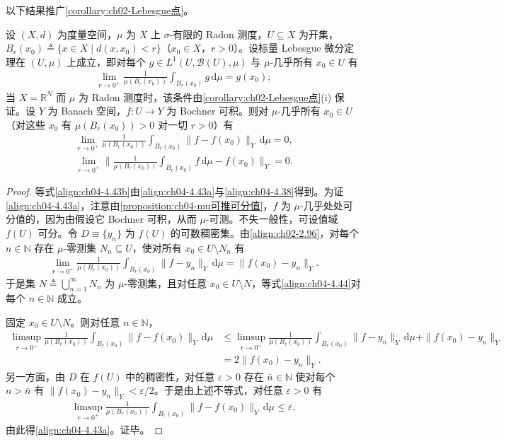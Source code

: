 \documentclass[../../main.tex]{subfiles}%
\begin{document}
以下结果推广\cref{corollary:ch02-Lebesgue点}。

\begin{proposition}\label{proposition:ch04-Lebesgue点}
设 $(X,d)$ 为度量空间，$\mu$ 为 $X$ 上 $\sigma$-有限的 Radon 测度，$U\subseteq X$ 为开集，$B_r(x_0)\triangleq\{x\in X\mid d(x,x_0)<r\}$（$x_0\in X$，$r>0$）。设标量 Lebesgue 微分定理在 $(U,\mu)$ 上成立，即对每个 $g\in L^1(U,\mathcal{B}(U),\mu)$ 与 $\mu$-几乎所有 $x_0\in U$ 有
\begin{align*}
\lim_{r\to0^+}\frac{1}{\mu(B_r(x_0))}\int_{B_r(x_0)}g\,\mathrm{d}\mu=g(x_0);
\end{align*}
当 $X=\mathbb{R}^N$ 而 $\mu$ 为 Radon 测度时，该条件由\cref{corollary:ch02-Lebesgue点}(i) 保证。设 $Y$ 为 Banach 空间，$f:U\to Y$ 为 Bochner 可积。则对 $\mu$-几乎所有 $x_0\in U$（对这些 $x_0$ 有 $\mu(B_r(x_0))>0$ 对一切 $r>0$）有
\begin{align}
\lim_{r\to0^+}\frac1{\mu(B_r(x_0))}\int_{B_r(x_0)}\|f-f(x_0)\|_Y\,\mathrm{d}\mu=0, \label{align:ch04-4.43a}
\end{align}
\begin{align}
\lim_{r\to0^+}\Big\|\frac1{\mu(B_r(x_0))}\int_{B_r(x_0)}f\,\mathrm{d}\mu-f(x_0)\Big\|_Y=0. \label{align:ch04-4.43b}
\end{align}
\end{proposition}

\begin{proof}
等式\eqref{align:ch04-4.43b}由\eqref{align:ch04-4.43a}与\eqref{align:ch04-4.38}得到。为证\eqref{align:ch04-4.43a}，注意由\cref{proposition:ch04-mu可推可分值}，$f$ 为 $\mu$-几乎处处可分值的，因为由假设它 Bochner 可积，从而 $\mu$-可测。不失一般性，可设值域 $f(U)$ 可分。令 $D\equiv\{y_n\}$ 为 $f(U)$ 的可数稠密集。由\eqref{align:ch02-2.96}，对每个 $n\in\mathbb{N}$ 存在 $\mu$-零测集 $N_n\subseteq U$，使对所有 $x_0\in U\setminus N_n$ 有
\begin{align}
\lim_{r\to0^+}\frac1{\mu(B_r(x_0))}\int_{B_r(x_0)}\|f-y_n\|_Y\,\mathrm{d}\mu=\|f(x_0)-y_n\|_Y. \label{align:ch04-4.44}
\end{align}
于是集 $N\triangleq \bigcup_{n=1}^\infty N_n$ 为 $\mu$-零测集，且对任意 $x_0\in U\setminus N$，等式\eqref{align:ch04-4.44}对每个 $n\in\mathbb{N}$ 成立。

固定 $x_0\in U\setminus N$。则对任意 $n\in\mathbb{N}$，
\begin{align*}
\limsup_{r\to0^+}\frac1{\mu(B_r(x_0))}\int_{B_r(x_0)}\|f-f(x_0)\|_Y\,\mathrm{d}\mu
&\leqslant\limsup_{r\to0^+}\frac1{\mu(B_r(x_0))}\int_{B_r(x_0)}\|f-y_n\|_Y\,\mathrm{d}\mu+\|f(x_0)-y_n\|_Y\\
&=2\|f(x_0)-y_n\|_Y.
\end{align*}
另一方面，由 $D$ 在 $f(U)$ 中的稠密性，对任意 $\varepsilon>0$ 存在 $\bar n\in\mathbb{N}$ 使对每个 $n>\bar n$ 有 $\|f(x_0)-y_n\|_Y<\varepsilon/2$。于是由上述不等式，对任意 $\varepsilon>0$ 有
\begin{align*}
\limsup_{r\to0^+}\frac1{\mu(B_r(x_0))}\int_{B_r(x_0)}\|f-f(x_0)\|_Y\,\mathrm{d}\mu\leqslant\varepsilon,
\end{align*}
由此得\eqref{align:ch04-4.43a}。证毕。
\end{proof}
\end{document}

